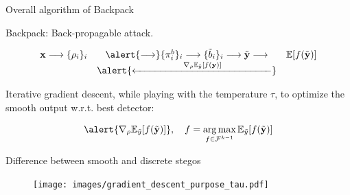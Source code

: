 \documentclass[10pt]{beamer}
\DeclareMathOperator*{\argmax}{arg\,max}
\begin{document}
\begin{frame}{Overall algorithm of Backpack}


\alert{Backpack}: \alert{Back-p}ropagable att\alert{ack}.

\begin{equation*}
    \begin{array}{ccc}
        \mathbf{x} \longrightarrow \{\rho_i\}_i & \alert{\longrightarrow}  \{\pi_i^b\}_i    \longrightarrow \{\tilde{b}_i\}_i \longrightarrow  \tilde{\mathbf{y}}  \longrightarrow  & \mathbb{E}[f(\tilde{\mathbf{y}})] \\
        & \alert{\xleftarrow{\hspace{5em} \nabla_\rho \mathbb{E}_{\tilde{y}} [f(\mathbf{y})]\hspace{5em}}} 
    \end{array}
\end{equation*}

\pause

Iterative gradient descent, while playing with the temperature $\tau$, to optimize the smooth output w.r.t. best detector:

\begin{equation}
    \alert{\nabla_\rho \mathbb{E}_{\tilde{y}} [f(\tilde{\mathbf{y}})]}, \quad  f = \argmax_{f \in \mathcal{F}^{k-1}} \mathbb{E}_{\tilde{y}} [f(\tilde{\mathbf{y}})]
\end{equation}


\end{frame}

\begin{frame}{Difference between smooth and discrete stegos}
    \begin{figure}[h]
        \texttt{[image: images/gradient\_descent\_purpose\_tau.pdf]}
    \end{figure}
\end{frame}
\end{document}

